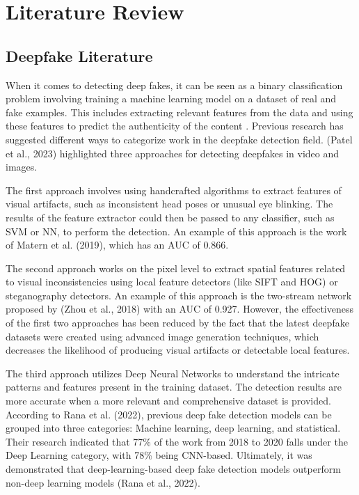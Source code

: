 \documentclass{svproc}
\begin{document}
\section{Literature Review}
\subsection{Deepfake Literature}
When it comes to detecting deep fakes, it can be seen as a binary
classification problem involving training a machine learning model on a dataset
of real and fake examples. This includes extracting relevant features from the
data and using these features to predict the authenticity of the content
\cite{patel2023deepfake}. Previous research has suggested different ways to
categorize work in the deepfake detection field. (Patel et al.,
2023)\cite{patel2023deepfake} highlighted three approaches for detecting
deepfakes in video and images.

The first approach involves using handcrafted algorithms to extract features of
visual artifacts, such as inconsistent head poses or unusual eye blinking. The
results of the feature extractor could then be passed to any classifier, such
as SVM or NN, to perform the detection. An example of this approach is the work
of Matern et al. (2019)\cite{}, which has an AUC of 0.866.

The second approach works on the pixel level to extract spatial features
related to visual inconsistencies using local feature detectors (like SIFT and
HOG) or steganography detectors. An example of this approach is the two-stream
network proposed by (Zhou et al., 2018) with an AUC of 0.927. However, the
effectiveness of the first two approaches has been reduced by the fact that the
latest deepfake datasets were created using advanced image generation
techniques, which decreases the likelihood of producing visual artifacts or
detectable local features.

The third approach utilizes Deep Neural Networks to understand the intricate
patterns and features present in the training dataset. The detection results
are more accurate when a more relevant and comprehensive dataset is provided.
According to Rana et al. (2022), previous deep fake detection models can be
grouped into three categories: Machine learning, deep learning, and
statistical. Their research indicated that 77\% of the work from 2018 to 2020 
falls under the Deep Learning category, with 78\% being CNN-based. 
Ultimately, it was demonstrated that deep-learning-based deep fake detection 
models outperform non-deep learning models (Rana et al., 2022).
\end{document}
